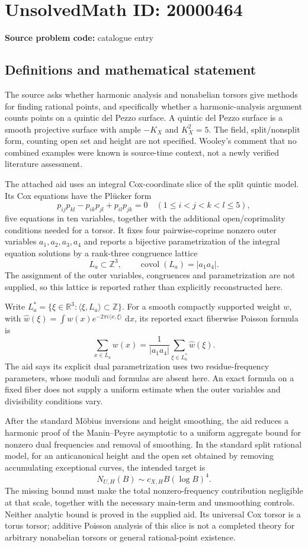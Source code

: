 \documentclass[11pt]{article}
\newcommand{\Z}{\mathbb{Z}}
\newcommand{\R}{\mathbb{R}}
\newcommand{\dd}{\,\mathrm{d}}
\begin{document}
\section*{UnsolvedMath ID: 20000464}
\textbf{Source problem code:} catalogue entry
\subsection{Definitions and mathematical statement}
The source asks whether harmonic analysis and nonabelian torsors give methods for finding rational points, and specifically whether a harmonic-analysis argument counts points on a quintic del Pezzo surface. A quintic del Pezzo surface is a smooth projective surface with ample \(-K_X\) and \(K_X^2=5\). The field, split/nonsplit form, counting open set and height are not specified. Wooley's comment that no combined examples were known is source-time context, not a newly verified literature assessment.

The attached aid uses an integral Cox-coordinate slice of the split quintic model. Its Cox equations have the Pl\"ucker form
\[
p_{ij}p_{kl}-p_{ik}p_{jl}+p_{il}p_{jk}=0
\quad(1\leq i<j<k<l\leq5),
\]
five equations in ten variables, together with the additional open/coprimality conditions needed for a torsor. It fixes four pairwise-coprime nonzero outer variables \(a_1,a_2,a_3,a_4\) and reports a bijective parametrization of the integral equation solutions by a rank-three congruence lattice
\[
L_a\subset\Z^3,\qquad\operatorname{covol}(L_a)=|a_1a_4|.
\]
The assignment of the outer variables, congruences and parametrization are not supplied, so this lattice is reported rather than explicitly reconstructed here.

Write \(L_a^*=\{\xi\in\R^3:\langle\xi,L_a\rangle\subset\Z\}\). For a smooth compactly supported weight \(w\), with \(\widehat w(\xi)=\int w(x)e^{-2\pi i\langle x,\xi\rangle}\,\dd x\), its reported exact fiberwise Poisson formula is
\[
\sum_{x\in L_a}w(x)=\frac1{|a_1a_4|}
\sum_{\xi\in L_a^*}\widehat w(\xi).
\]
The aid says its explicit dual parametrization uses two residue-frequency parameters, whose moduli and formulas are absent here. An exact formula on a fixed fiber does not supply a uniform estimate when the outer variables and divisibility conditions vary.

After the standard M\"obius inversions and height smoothing, the aid reduces a harmonic proof of the Manin--Peyre asymptotic to a uniform aggregate bound for nonzero dual frequencies and removal of smoothing. In the standard split rational model, for an anticanonical height and the open set obtained by removing accumulating exceptional curves, the intended target is
\[
N_{U,H}(B)\sim c_{X,H}B(\log B)^4.
\]
The missing bound must make the total nonzero-frequency contribution negligible at that scale, together with the necessary main-term and unsmoothing controls. Neither analytic bound is proved in the supplied aid. Its universal Cox torsor is a torus torsor; additive Poisson analysis of this slice is not a completed theory for arbitrary nonabelian torsors or general rational-point existence.
\end{document}
